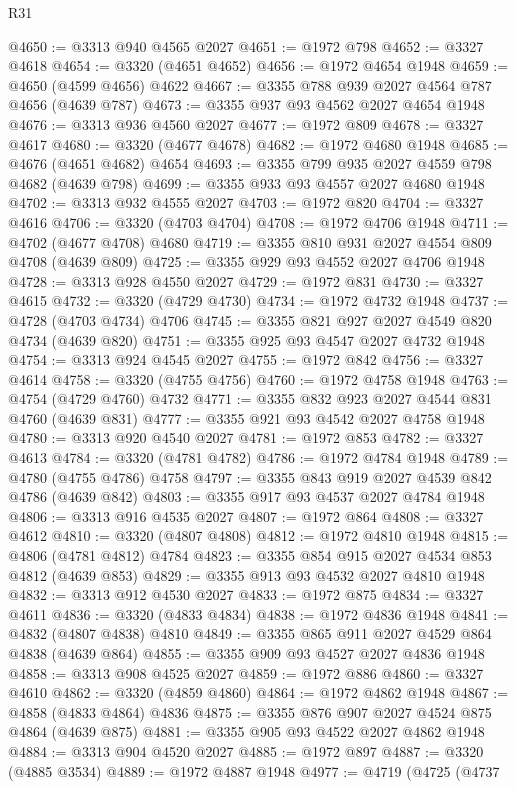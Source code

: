 \begin{lexlean}{R31}
\begin{coremodule}
@4650 := @3313 @940 @4565 @2027
@4651 := @1972 @798
@4652 := @3327 @4618
@4654 := @3320 (@4651 @4652)
@4656 := @1972 @4654 @1948
@4659 := @4650 (@4599 @4656) @4622
@4667 := @3355 @788 @939 @2027 @4564 @787 @4656 (@4639 @787)
@4673 := @3355 @937 @93 @4562 @2027 @4654 @1948
@4676 := @3313 @936 @4560 @2027
@4677 := @1972 @809
@4678 := @3327 @4617
@4680 := @3320 (@4677 @4678)
@4682 := @1972 @4680 @1948
@4685 := @4676 (@4651 @4682) @4654
@4693 := @3355 @799 @935 @2027 @4559 @798 @4682 (@4639 @798)
@4699 := @3355 @933 @93 @4557 @2027 @4680 @1948
@4702 := @3313 @932 @4555 @2027
@4703 := @1972 @820
@4704 := @3327 @4616
@4706 := @3320 (@4703 @4704)
@4708 := @1972 @4706 @1948
@4711 := @4702 (@4677 @4708) @4680
@4719 := @3355 @810 @931 @2027 @4554 @809 @4708 (@4639 @809)
@4725 := @3355 @929 @93 @4552 @2027 @4706 @1948
@4728 := @3313 @928 @4550 @2027
@4729 := @1972 @831
@4730 := @3327 @4615
@4732 := @3320 (@4729 @4730)
@4734 := @1972 @4732 @1948
@4737 := @4728 (@4703 @4734) @4706
@4745 := @3355 @821 @927 @2027 @4549 @820 @4734 (@4639 @820)
@4751 := @3355 @925 @93 @4547 @2027 @4732 @1948
@4754 := @3313 @924 @4545 @2027
@4755 := @1972 @842
@4756 := @3327 @4614
@4758 := @3320 (@4755 @4756)
@4760 := @1972 @4758 @1948
@4763 := @4754 (@4729 @4760) @4732
@4771 := @3355 @832 @923 @2027 @4544 @831 @4760 (@4639 @831)
@4777 := @3355 @921 @93 @4542 @2027 @4758 @1948
@4780 := @3313 @920 @4540 @2027
@4781 := @1972 @853
@4782 := @3327 @4613
@4784 := @3320 (@4781 @4782)
@4786 := @1972 @4784 @1948
@4789 := @4780 (@4755 @4786) @4758
@4797 := @3355 @843 @919 @2027 @4539 @842 @4786 (@4639 @842)
@4803 := @3355 @917 @93 @4537 @2027 @4784 @1948
@4806 := @3313 @916 @4535 @2027
@4807 := @1972 @864
@4808 := @3327 @4612
@4810 := @3320 (@4807 @4808)
@4812 := @1972 @4810 @1948
@4815 := @4806 (@4781 @4812) @4784
@4823 := @3355 @854 @915 @2027 @4534 @853 @4812 (@4639 @853)
@4829 := @3355 @913 @93 @4532 @2027 @4810 @1948
@4832 := @3313 @912 @4530 @2027
@4833 := @1972 @875
@4834 := @3327 @4611
@4836 := @3320 (@4833 @4834)
@4838 := @1972 @4836 @1948
@4841 := @4832 (@4807 @4838) @4810
@4849 := @3355 @865 @911 @2027 @4529 @864 @4838 (@4639 @864)
@4855 := @3355 @909 @93 @4527 @2027 @4836 @1948
@4858 := @3313 @908 @4525 @2027
@4859 := @1972 @886
@4860 := @3327 @4610
@4862 := @3320 (@4859 @4860)
@4864 := @1972 @4862 @1948
@4867 := @4858 (@4833 @4864) @4836
@4875 := @3355 @876 @907 @2027 @4524 @875 @4864 (@4639 @875)
@4881 := @3355 @905 @93 @4522 @2027 @4862 @1948
@4884 := @3313 @904 @4520 @2027
@4885 := @1972 @897
@4887 := @3320 (@4885 @3534)
@4889 := @1972 @4887 @1948
@4977 := @4719
    (@4725
      (@4737

\end{coremodule}
\end{lexlean}
